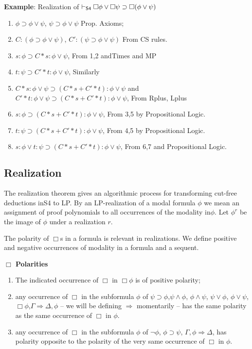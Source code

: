  \begin{mdframed}
  \textbf{Example}: Realization of $\vdash_{\sf S4}\Box\phi\vee\Box\psi\supset\Box(\phi\vee\psi)$
  \begin{enumerate}
     \item $\phi\supset\phi\vee\psi$, $\psi\supset\phi\vee\psi$ Prop. Axioms;
     \item $C:(\phi\supset \phi\vee \psi)$, $C':(\psi\supset \phi\vee \psi)$ From {\sf CS} rules.
      \item $s:\phi\supset C*s:\phi\vee\psi$, From 1,2 and{\sf Times} and {\sf MP}
      \item $t:\psi\supset C'*t:\phi\vee\psi$, Similarly 
      \item $C*s:\phi\vee\psi\supset(C*s+C'*t):\phi\vee\psi$ and $C'*t:\phi\vee\psi\supset(C*s+C'*t):\phi\vee\psi$, From {\sf Rplus, Lplus} 
      \item $s:\phi\supset(C*s+C'*t):\phi\vee\psi$, 
      From 3,5 by Propositional Logic.
      \item $t:\psi\supset(C*s+C'*t):\phi\vee\psi$,
      From 4,5 by Propositional Logic.
      \item  $s:\phi\vee t:\psi\supset(C*s+C'*t):\phi\vee\psi$,
      From 6,7 and Propositional Logic.
      
  \end{enumerate}
  
  \end{mdframed}

\subsection{Realization}							
The realization theorem gives an algorithmic process for transforming cut-free deductions in{\sf S4} to {\sf LP}.
By an {\sf LP}-realization of a modal formula $\phi$ we mean an assignment of proof polynomials to
all occurrences of the modality in$ \phi$. Let $\phi^{r}$  be the image of $\phi$ under a realization $r$. 

The polarity of $\Box$s in a formula is relevant in realizations.  
We define positive
and negative occurrences of modality in a formula and a sequent.
\begin{mdframed}

\textbf{$\Box$ Polarities}
\begin{enumerate}
\item The indicated occurrence of $\Box$ in $\Box\phi$ is of positive polarity; 
\item any occurrence of $\Box$ in the subformula $\phi$ of $\psi\supset\phi$,$\psi\wedge\phi$, $\phi\wedge\psi$, $\psi\vee\phi$, $\phi\vee\psi$, $\Box\phi$,$\Gamma\Rightarrow\Delta,\phi$ -- we will be defining $\Rightarrow$ momentarily -- has the same polarity as the same occurrence of $\Box$ in $\phi$.
\item any occurrence of $\Box$ in the subformula $\phi$ of $\neg\phi$,  $\phi\supset\psi$, $\Gamma,\phi\Rightarrow\Delta$, has polarity opposite to the polarity of the very same  occurrence of $\Box$ in $\phi$.

\end{enumerate}

\end{mdframed}


